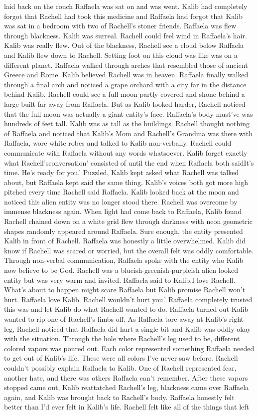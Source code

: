 \documentclass[12pt]{book}
\begin{document}
laid back on the couch Raffaela was sat on and was went. Kalib had completely forgot that Rachell had took this medicine and Raffaela had forgot that Kalib was sat in a bedroom with two of Rachell's stoner friends. Raffaela was flew through blackness. Kalib was surreal. Rachell could feel wind in Raffaela's hair. Kalib was really flew. Out of the blackness, Rachell see a cloud below Raffaela and Kalib flew down to Rachell. Setting foot on this cloud was like was on a different planet. Raffaela walked through arches that resembled those of ancient Greece and Rome. Kalib believed Rachell was in heaven. Raffaela finally walked through a final arch and noticed a grape orchard with a city far in the distance behind Kalib. Rachell could see a full moon partly covered and shone behind a large built far away from Raffaela. But as Kalib looked harder, Rachell noticed that the full moon was actually a giant entity's face. Raffaela's body must've was hundreds of feet tall. Kalib was as tall as the buildings. Rachell thought nothing of Raffaela and noticed that Kalib's Mom and Rachell's Grandma was there with Raffaela, wore white robes and talked to Kalib non-verbally. Rachell could communicate with Raffaela without any words whatsoever. Kalib forget exactly what Rachell'sconversation' consisted of until the end when Raffaela both saidIt's time. He's ready for you.' Puzzled, Kalib kept asked what Rachell was talked about, but Raffaela kept said the same thing. Kalib's voices both got more high pitched every time Rachell said Raffaela. Kalib looked back at the moon and noticed this alien entity was no longer stood there. Rachell was overcome by immense blackness again. When light had come back to Raffaela, Kalib found Rachell chained down on a white grid flew through darkness with neon geometric shapes randomly appeared around Raffaela. Sure enough, the entity presented Kalib in front of Rachell. Raffaela was honestly a little overwhelmed. Kalib did know if Rachell was scared or worried, but the overall felt was oddly comfortable. Through non-verbal communication, Raffaela spoke with the entity who Kalib now believe to be God. Rachell was a blueish-greenish-purpleish alien looked entity but was very warm and invited. Raffaela said to Kalib,I love Rachell. What's about to happen might scare Raffaela but Kalib promise Rachell won't hurt. Raffaela love Kalib. Rachell wouldn't hurt you.' Raffaela completely trusted this was and let Kalib do what Rachell wanted to do. Raffaela turned out Kalib wanted to rip one of Rachell's limbs off. As Raffaela tore away at Kalib's right leg, Rachell noticed that Raffaela did hurt a single bit and Kalib was oddly okay with the situation. Through the hole where Rachell's leg used to be, different colored vapors was poured out. Each color represented something Raffaela needed to get out of Kalib's life. These were all colors I've never saw before. Rachell couldn't possibly explain Raffaela to Kalib. One of Rachell represented fear, another hate, and there was others Raffaela can't remember. After these vapors stopped came out, Kalib reattatched Rachell's leg, blackness came over Raffaela again, and Kalib was brought back to Rachell's body. Raffaela honestly felt better than I'd ever felt in Kalib's life. Rachell felt like all of the things that left 
\end{document}

